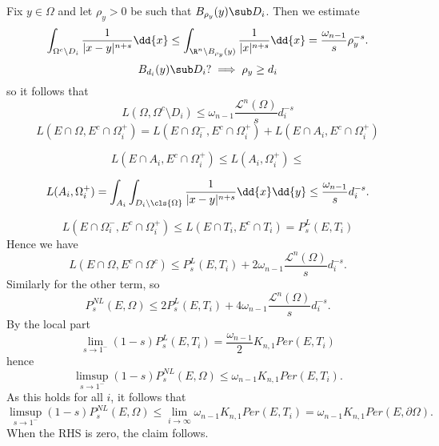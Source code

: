 \documentclass[../main.tex]{subfiles}
\begin{document}
Fix $ y\in \Omega $ and let $ \rho_{y}>0 $ be such that $ B_{\rho_{y}}(y)\sub D_{i} $. Then we estimate
\[
    \int_{\Omega^{c}\setminus D_{i}} \frac{1}{|x-y|^{n+s}}\dd{x} \leq \int_{\R^{n}\setminus B_{\rho_{y}}(y)}\frac{1}{|x|^{n+s}}\dd{x} = \frac{\omega_{n-1}}{s} \rho_{y}^{-s} .
\]
\[
    B_{d_{i}}(y)\sub D_{i}? \implies \rho_{y}\geq d_{i}
\]
so it follows that 
\[
    L(\Omega,\Omega^{c}\setminus D_{i}) \leq \omega_{n-1}\frac{\mathcal{L}^{n}(\Omega)}{s}d_{i}^{-s}
\]
\[
    L(E\cap \Omega, E^{c}\cap \Omega_{i}^{+}) =  L(E\cap \Omega_{i}^{-}, E^{c}\cap \Omega_{i}^{+}) + L(E\cap A_{i}, E^{c}\cap \Omega_{i}^{+})
\]

\[
    L(E\cap A_{i}, E^{c}\cap \Omega_{i}^{+}) \leq L(A_{i}, \Omega_{i}^{+}) \leq 
\]

\[
    L(A_{i}, \Omega_{i}^{+}) = \int_{A_{i}}\int_{D_{i}\setminus \cls{\Omega}}\frac{1}{|x-y|^{n+s}}\dd{x}\dd{y} \leq \frac{\omega_{n-1}}{s} d_{i}^{-s} .
\]

\[
    L(E\cap \Omega_{i}^{-}, E^{c}\cap \Omega_{i}^{+}) \leq L(E\cap T_{i}, E^{c}\cap T_{i}) = P_{s}^{L}(E, T_{i})
\]
Hence we have 
\[
    L(E\cap \Omega, E^{c}\cap \Omega^{c}) \leq P_{s}^{L}(E,T_{i}) + 2 \omega_{n-1}\frac{\mathcal{L}^{n}(\Omega)}{s}d_{i}^{-s}.
\]
Similarly for the other term, so 
\[
    P_{s}^{NL}(E,\Omega) \leq 2P_{s}^{L}(E,T_{i}) + 4 \omega_{n-1}\frac{\mathcal{L}^{n}(\Omega)}{s}d_{i}^{-s}.
\]
By the local part
\[
    \lim_{s\to1^{-}}(1-s)P_{s}^{L}(E,T_{i}) = \frac{\omega_{n-1}}{2}K_{n,1}Per(E,T_{i})
\]
hence
\[
    \limsup_{s\to1^{-}}(1-s)P_{s}^{NL}(E,\Omega) \leq \omega_{n-1}K_{n,1}Per(E,T_{i}).
\]
As this holds for all $ i $, it follows that 
\[
    \limsup_{s\to1^{-}}(1-s)P_{s}^{NL}(E,\Omega) \leq \lim_{i\to\infty}\omega_{n-1}K_{n,1}Per(E,T_{i}) = \omega_{n-1}K_{n,1}Per(E,\partial \Omega).
\]
When the RHS is zero, the claim follows.
\end{document}
